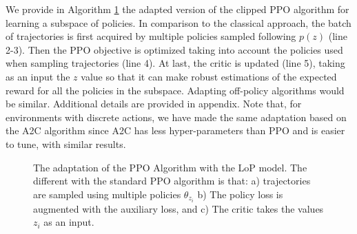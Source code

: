 We provide in Algorithm \ref{alg:lop_ppo} the adapted version of the clipped PPO algorithm \citep{ppo} for learning a subspace of policies. In comparison to the classical approach, the batch of trajectories is first acquired by multiple policies sampled following $p(z)$ (line 2-3). Then the PPO objective is optimized taking into account the policies used when sampling trajectories (line 4). At last, the critic is updated (line 5), taking as an input the $z$ value so that it can make robust estimations of the expected reward for all the policies in the subspace. Adapting off-policy algorithms would be similar. Additional details are provided in appendix. Note that, for environments with discrete actions, we have made the same adaptation based on the A2C algorithm since A2C has less hyper-parameters than PPO and is easier to tune, with similar results.

\begin{figure}[t]
            \begin{algorithm}[H]
            
            \end{algorithm}
    \label{alg:lop_ppo}
    \vspace{-0.3cm}
    \caption{The adaptation of the PPO Algorithm with the LoP model. The different with the standard PPO algorithm is that: a) trajectories are sampled using multiple policies $\theta_{z_i}$ b) The policy loss is augmented with the auxiliary loss, and c) The critic takes the values $z_i$ as an input.}
    \vspace{-0.3cm}
\end{figure}



